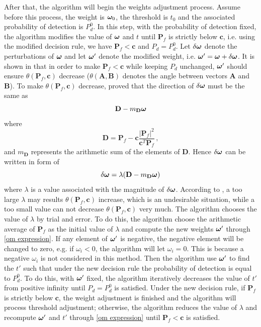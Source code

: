 After that, the algorithm will begin the weights adjustment process. 
Assume before this process, the weight is $\boldsymbol{\omega}_0$, the threshold is $t_0$ and the associated probability of detection is $P_d^0$.
In this step, with the probability of detection fixed, the algorithm modifies the value of $\boldsymbol{\omega}$ and $t$ until $\mathbf{P}_f$ is strictly below $ \mathbf{c}$, i.e. using the modified decision rule, we have $\mathbf{P}_f < \mathbf{c}$ and $P_d = P_d^0$. 
Let $\delta\boldsymbol{\omega}$ denote the perturbations of $\boldsymbol{\omega}$ and let $\boldsymbol{\omega}'$ denote the modified weight, i.e. $\boldsymbol{\omega}' = \boldsymbol{\omega} + \delta\boldsymbol{\omega}$.  It is shown in \cite{zhang2000efficient} that in order to make $\mathbf{P}_f < \mathbf{c}$ while keeping $P_d$ unchanged, $\boldsymbol{\omega}'$ should ensure $\theta(\mathbf{P}_f, \mathbf{c})$ decrease ($\theta(\mathbf{A}, \mathbf{B})$ denotes the angle between vectors $\mathbf{A}$ and $\mathbf{B}$). To make $\theta(\mathbf{P}_f, \mathbf{c})$ decrease, \cite{zhang2000efficient} proved that the direction of $\delta\boldsymbol{\omega}$ must be the same as
\begin{equation}
\label{direction}
\mathbf{D} - m_\mathbf{D}\boldsymbol{\omega}
\end{equation}
where 
\[
\mathbf{D} = \mathbf{P}_f - \mathbf{c}\frac{|\mathbf{P}_f|^2}{\mathbf{c}^T\mathbf{P}_f}\,,
\]
and $m_{\mathbf{D}}$ represents the arithmetic sum of the elements of $\mathbf{D}$. Hence $\delta\boldsymbol{\omega}$ can be written in form of 
\begin{equation}
\label{om expression}
\delta\boldsymbol{\omega} = \lambda( \mathbf{D} - m_\mathbf{D}\boldsymbol{\omega}) 
\end{equation}
where $\lambda$ is a value associated with the magnitude of $\delta\boldsymbol{\omega}$.
According to \cite{zhang2000efficient}, a too large $\lambda$ may results $\theta(\mathbf{P}_f, \mathbf{c})$ increase, which is an undesirable situation, while a too small value can not decrease $\theta(\mathbf{P}_f, \mathbf{c})$ very much. The algorithm chooses the value of $\lambda$ by trial and error. To do this, the algorithm choose the arithmetic average of $\mathbf{P}_f$ as the initial value of $\lambda$ and compute the new weights $\boldsymbol{\omega}'$ through \eqref{om expression}. 
If any element of $\boldsymbol{\omega}'$ is negative, the negative element will be changed to zero, e.g. if $\omega_i < 0$, the algorithm will let $\omega_i = 0$. This is because a negative  $\omega_i$ is not considered in this method.  
Then the algorithm use $\boldsymbol{\omega}'$ to find the $t'$ such that under the new decision rule the probability of detection is equal to  $P_d^0$. To do this, with $\boldsymbol{\omega}'$ fixed, the algorithm iteratively decreases the value of $t'$ from positive infinity until $P_d = P_d^0$ is satisfied. Under the new decision rule, if $\mathbf{P}_f$ is strictly below $\mathbf{c}$, the weight adjustment is finished and the algorithm will process threshold adjustment; otherwise, the algorithm reduces the value of $\lambda$ and recompute $\boldsymbol{\omega}'$ and $t'$ through \eqref{om expression} until $\mathbf{P}_f < \mathbf{c}$  is satisfied. 

